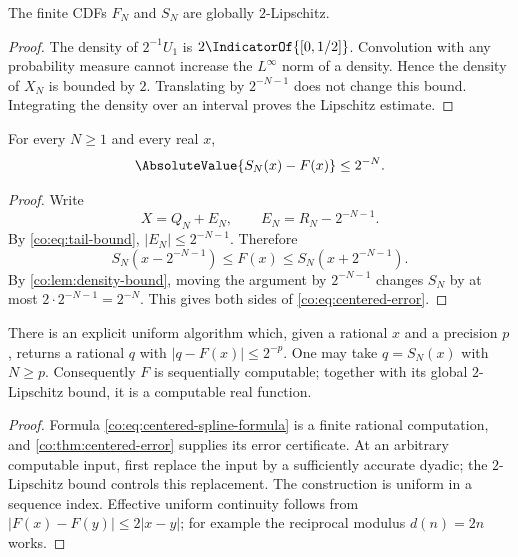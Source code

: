 \begin{lemma}\label{co:lem:density-bound}
The finite CDFs $F_N$ and $S_N$ are globally $2$-Lipschitz.
\end{lemma}

\begin{proof}
The density of $2^{-1}U_1$ is $2\IndicatorOf{[0,1/2]}$.  Convolution with any
probability measure cannot increase the $L^\infty$ norm of a density.  Hence
the density of $X_N$ is bounded by $2$.  Translating by $2^{-N-1}$ does not
change this bound.  Integrating the density over an interval proves the
Lipschitz estimate.
\end{proof}

\begin{theorem}\label{co:thm:centered-error}
For every $N\ge1$ and every real $x$,
\begin{equation}\label{co:eq:centered-error}
 \AbsoluteValue{S_N(x)-F(x)}\le2^{-N}.
\end{equation}
\end{theorem}

\begin{proof}
Write
\[
 X=Q_N+E_N,
 \qquad
 E_N=R_N-2^{-N-1}.
\]
By \eqref{co:eq:tail-bound}, $|E_N|\le2^{-N-1}$.  Therefore
\[
 S_N(x-2^{-N-1})\le F(x)\le S_N(x+2^{-N-1}).
\]
By \cref{co:lem:density-bound}, moving the argument by $2^{-N-1}$ changes $S_N$
by at most $2\cdot2^{-N-1}=2^{-N}$.  This gives both sides of
\eqref{co:eq:centered-error}.
\end{proof}

\begin{corollary}\label{co:cor:F-computable}
There is an explicit uniform algorithm which, given a rational $x$ and a
precision $p$, returns a rational $q$ with
$|q-F(x)|\le2^{-p}$.  One may take $q=S_N(x)$ with $N\ge p$.
Consequently $F$ is sequentially computable; together with its global
$2$-Lipschitz bound, it is a computable real function.
\end{corollary}

\begin{proof}
Formula \eqref{co:eq:centered-spline-formula} is a finite rational computation,
and \cref{co:thm:centered-error} supplies its error certificate.  At an arbitrary
computable input, first replace the input by a sufficiently accurate dyadic;
the $2$-Lipschitz bound controls this replacement.  The construction is
uniform in a sequence index.  Effective uniform continuity follows from
$|F(x)-F(y)|\le2|x-y|$; for example the reciprocal modulus $d(n)=2n$ works.
\end{proof}

